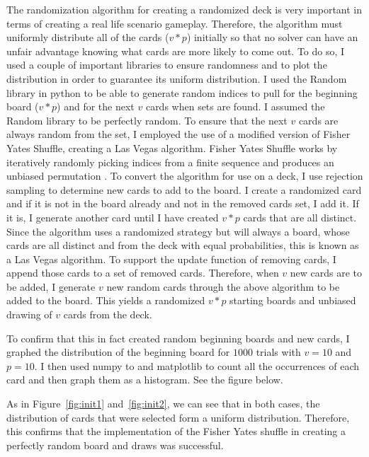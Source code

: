 \documentclass[pageno]{jpaper}
\begin{document}
The randomization algorithm for creating a randomized deck is very important in terms of creating a real life scenario gameplay. Therefore, the algorithm must uniformly distribute all of the cards ($v*p$) initially so that no solver can have an unfair advantage knowing what cards are more likely to come out. To do so, I used a couple of important libraries to ensure randomness and to plot the distribution in order to guarantee its uniform distribution. I used the Random library in python to be able to generate random indices to pull for the beginning board ($v*p$) and for the next $v$ cards when sets are found. I assumed the Random library to be perfectly random. To ensure that the next $v$ cards are always random from the set, I employed the use of a modified version of Fisher Yates Shuffle, creating a Las Vegas algorithm. Fisher Yates Shuffle works by iteratively randomly picking indices from a finite sequence and produces an unbiased permutation \cite{fisher}. To convert the algorithm for use on a deck, I use rejection sampling to determine new cards to add to the board. I create a randomized card and if it is not in the board already and not in the removed cards set, I add it. If it is, I generate another card until I have created $v*p$ cards that are all distinct. Since the algorithm uses a randomized strategy but will always a board, whose cards are all distinct and from the deck with equal probabilities, this is known as a Las Vegas algorithm. To support the update function of removing cards, I append those cards to a set of removed cards. Therefore, when $v$ new cards are to be added, I generate $v$ new random cards through the above algorithm to be added to the board. This yields a randomized $v*p$ starting boards and unbiased drawing of $v$ cards from the deck.

To confirm that this in fact created random beginning boards and new cards, I graphed the distribution of the beginning board for $1000$ trials with $v = 10$ and $p = 10$. I then used numpy to and matplotlib to count all the occurrences of each card and then graph them as a histogram. See the figure below.

As in Figure~\ref{fig:init1}  and~\ref{fig:init2}, we can see that in both cases, the distribution of cards that were selected form a uniform distribution. Therefore, this confirms that the implementation of the Fisher Yates shuffle in creating a perfectly random board and draws was successful. 
\end{document}
